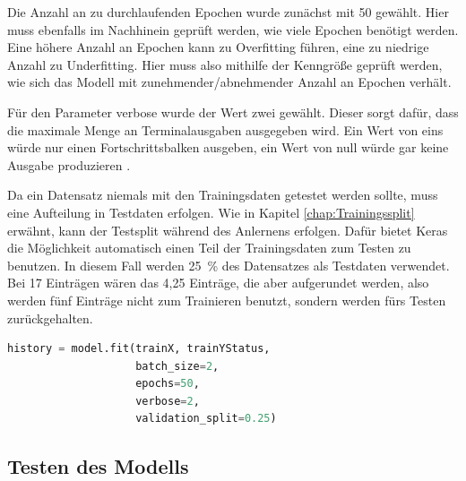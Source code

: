 Die Anzahl an zu durchlaufenden Epochen wurde zunächst mit 50 gewählt. Hier muss ebenfalls im Nachhinein geprüft werden, wie viele Epochen benötigt werden. Eine höhere Anzahl an Epochen kann zu 
Overfitting führen, eine zu niedrige Anzahl zu Underfitting. Hier muss also mithilfe der Kenngröße geprüft werden, wie sich das Modell mit zunehmender/abnehmender Anzahl an Epochen verhält.

Für den Parameter \glqq verbose\grqq{} wurde der Wert zwei gewählt. Dieser sorgt dafür, dass die maximale Menge an Terminalausgaben ausgegeben wird. Ein Wert von eins würde nur einen 
Fortschrittsbalken ausgeben, ein Wert von null würde gar keine Ausgabe produzieren \cite{KerasDoc}.

Da ein Datensatz niemals mit den Trainingsdaten getestet werden sollte, muss eine Aufteilung in Testdaten erfolgen. Wie in Kapitel \ref*{chap:Trainingssplit} erwähnt, kann der Testsplit
während des Anlernens erfolgen. Dafür bietet Keras die Möglichkeit automatisch einen Teil der Trainingsdaten zum Testen zu benutzen.
In diesem Fall werden 25~\% des Datensatzes als Testdaten verwendet. Bei 17 Einträgen wären das 4,25 Einträge, die aber aufgerundet werden, also werden fünf Einträge 
nicht zum Trainieren benutzt, sondern werden fürs Testen zurückgehalten.

\begin{lstlisting}[language = python, caption={Trainieren des Modells},captionpos=b, label = lst:TrainModel, float, floatplacement=H]
    history = model.fit(trainX, trainYStatus,
                    batch_size=2,
                    epochs=50,
                    verbose=2,
                    validation_split=0.25)
\end{lstlisting}

\subsection{Testen des Modells}
\label{chap:TestNN}

